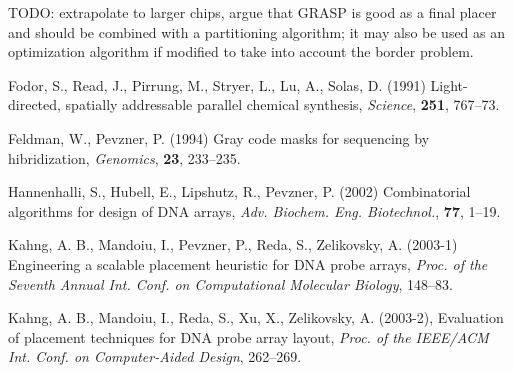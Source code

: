 \documentclass{bioinfo}
\begin{document}
TODO: extrapolate to larger chips, argue that GRASP is good as a final placer and should be combined with a partitioning algorithm; it may also be used as an optimization algorithm if modified to take into account the border problem.

\begin{thebibliography}{}

 Fodor, S., Read, J., Pirrung, M., Stryer, L., Lu, A., Solas, D. (1991) Light-directed, spatially addressable parallel chemical synthesis, {\it Science}, {\bf 251}, 767--73.

 Feldman, W., Pevzner, P. (1994) Gray code masks for sequencing by hibridization, {\it Genomics}, {\bf 23}, 233--235.

 Hannenhalli, S., Hubell, E., Lipshutz, R., Pevzner, P. (2002) Combinatorial algorithms for design of DNA arrays, {\it Adv. Biochem. Eng. Biotechnol.}, {\bf 77}, 1--19.

 Kahng, A. B., Mandoiu, I., Pevzner, P., Reda, S., Zelikovsky, A. (2003-1) Engineering a scalable placement heuristic for DNA probe arrays, {\it Proc. of the Seventh Annual Int. Conf. on Computational Molecular Biology}, 148--83.

 Kahng, A. B., Mandoiu, I., Reda, S., Xu, X., Zelikovsky, A. (2003-2), Evaluation of placement techniques for DNA probe array layout, {\it Proc. of the IEEE/ACM Int. Conf. on Computer-Aided Design}, 262--269.

\end{thebibliography}
\end{document}

